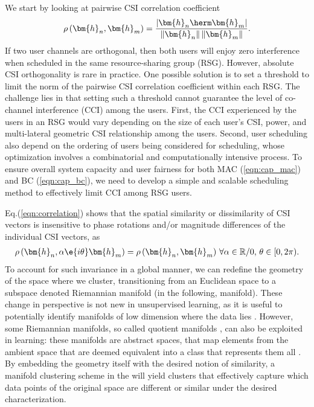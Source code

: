 We start by looking at pairwise CSI correlation coefficient
\begin{equation}
	\rho \left( \bm{h}_{n},\bm{h}_{m} \right) = \frac{ | \bm{h}_n\herm \bm{h}_m |}{ \left\| \bm{h}_n \right\|\left\|\bm{ h}_m \right\|}. \label{eqn:correlation}
\end{equation}
If two user channels are orthogonal, then
both users will enjoy zero interference when scheduled in the same resource-sharing group (RSG). 
However, absolute CSI orthogonality is rare in practice. 
One possible solution is to set a threshold to limit the norm of the 
pairwise CSI correlation coefficient within each RSG. The challenge 
lies in that setting such a threshold cannot guarantee the
level of co-channel interference (CCI) among the users. First, the CCI experienced by
the users in an RSG would vary depending on the
size of each user's CSI, power, and multi-lateral geometric CSI relationship among
the users. Second, user scheduling also depend on the ordering of users being considered
for scheduling, whose optimization involves a 
combinatorial and computationally intensive process. 
To ensure overall system capacity and user
fairness for both MAC (\ref{eqn:cap_mac}) and BC (\ref{eqn:cap_bc}),
we need to develop a simple and scalable scheduling method to 
effectively limit CCI among RSG users.


Eq.(\ref{eqn:correlation}) shows that the spatial similarity or dissimilarity of CSI vectors is insensitive to phase rotations and/or magnitude differences of the individual CSI vectors, as
\begin{align}
	\rho \left( \bm{h}_{n},\alpha\e{i\theta}\bm{h}_{m} \right)=\rho \left( \bm{h}_{n},\bm{h}_{m} \right)\,\forall \alpha\in\mathbb{R}/0,\,\theta\in[0,2\pi).\nonumber
\end{align}
To account for such invariance in a global manner, we can redefine the geometry of the space where we cluster, transitioning from an Euclidean space to a subspace denoted Riemannian manifold (in the following, manifold). These change in perspective is not new in unsupervised learning, as it is useful to potentially identify manifolds of low dimension where the data lies \cite{Goh2008}. However, some Riemannian manifolds, so called quotient manifolds \cite{boumal2020intromanifolds}, can also be exploited in learning: these manifolds are abstract spaces, that map elements from the ambient space that are deemed equivalent into a class that represents them all \cite{Absil2008book}. By embedding the geometry itself with the desired notion of similarity, a manifold clustering scheme in the will yield clusters that effectively capture which data points of the original space are different or similar under the desired characterization.

